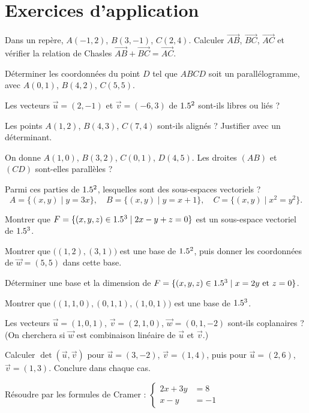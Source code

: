\section{Exercices d'application}

\exo{} Dans un repère, $A(-1,2)$, $B(3,-1)$, $C(2,4)$. Calculer $\vec{AB}$, $\vec{BC}$,
$\vec{AC}$ et vérifier la relation de Chasles $\vec{AB}+\vec{BC}=\vec{AC}$.

\exo{} Déterminer les coordonnées du point $D$ tel que $ABCD$ soit un parallélogramme,
avec $A(0,1)$, $B(4,2)$, $C(5,5)$.

\exo{} Les vecteurs $\vec u=(2,-1)$ et $\vec v=(-6,3)$ de $1.5^2$ sont-ils libres ou liés ?

\exo{} Les points $A(1,2)$, $B(4,3)$, $C(7,4)$ sont-ils alignés ? Justifier avec un
déterminant.

\exo{} On donne $A(1,0)$, $B(3,2)$, $C(0,1)$, $D(4,5)$. Les droites $(AB)$ et $(CD)$
sont-elles parallèles ?

\exo{} Parmi ces parties de $1.5^2$, lesquelles sont des sous-espaces vectoriels ?
\[
A=\{(x,y)\mid y=3x\},\quad B=\{(x,y)\mid y=x+1\},\quad C=\{(x,y)\mid x^2=y^2\}.
\]

\exo{} Montrer que $F=\{(x,y,z)\in1.5^3\mid 2x-y+z=0\}$ est un sous-espace vectoriel de $1.5^3$.

\exo{} Montrer que $\big((1,2),(3,1)\big)$ est une base de $1.5^2$, puis donner les
coordonnées de $\vec w=(5,5)$ dans cette base.

\exo{} Déterminer une base et la dimension de
$F=\{(x,y,z)\in1.5^3\mid x=2y \text{ et } z=0\}$.

\exo{} Montrer que $\big((1,1,0),(0,1,1),(1,0,1)\big)$ est une base de $1.5^3$.

\exo{} Les vecteurs $\vec u=(1,0,1)$, $\vec v=(2,1,0)$, $\vec w=(0,1,-2)$ sont-ils
coplanaires ? (On cherchera si $\vec w$ est combinaison linéaire de $\vec u$ et $\vec v$.)

\exo{} Calculer $\det(\vec u,\vec v)$ pour $\vec u=(3,-2)$, $\vec v=(1,4)$, puis pour
$\vec u=(2,6)$, $\vec v=(1,3)$. Conclure dans chaque cas.

\exo{} Résoudre par les formules de Cramer :
$\left\{\begin{aligned}2x+3y&=8\\ x-y&=-1\end{aligned}\right.$

